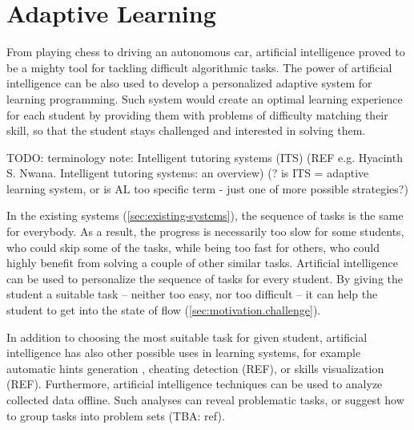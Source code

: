\chapter{Adaptive Learning}
\label{chap:adaptive-learning}


From playing chess to driving an autonomous car,
  artificial intelligence proved to be a mighty tool
  for tackling difficult algorithmic tasks.
The power of artificial intelligence can be also used
  to develop a personalized adaptive system for learning programming.
Such system would create an optimal learning experience for each student
  by providing them with problems of difficulty matching their skill,
  so that the student stays challenged and interested in solving them.

TODO: terminology note: Intelligent tutoring systems (ITS)
  (REF e.g. Hyacinth S. Nwana. Intelligent tutoring systems: an overview)
  (? is ITS = adaptive learning system, or is AL too specific term - just
  one of more possible strategies?)

In the existing systems (\ref{sec:existing-systems}),
  the sequence of tasks is the same for everybody.
As a result, the progress is necessarily too slow for some students,
  who could skip some of the tasks,
  while being too fast for others,
  who could highly benefit from solving a couple of other similar tasks.
Artificial intelligence can be used to personalize
  the sequence of tasks for every student.
By giving the student a suitable task
  -- neither too easy, nor too difficult --
  it can help the student to get into the state of flow
  (\ref{sec:motivation.challenge}).

In addition to choosing the most suitable task for given student,
  artificial intelligence has also other possible uses in learning systems,
  for example automatic hints generation \cite{generating-hints},
  cheating detection (REF),
  or skills visualization (REF).
Furthermore, artificial intelligence techniques can be used
  to analyze collected data offline.
Such analyses can reveal problematic tasks,
  or suggest how to group tasks into problem sets (TBA: ref).

